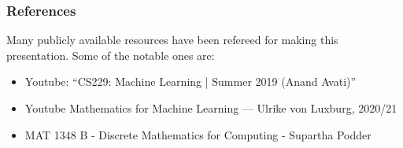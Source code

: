 \begin{frame}\frametitle{References}
Many publicly available resources have been refereed for making this presentation. Some of the notable ones are:
\small
\begin{itemize}
\item Youtube: ``CS229: Machine Learning | Summer 2019 (Anand Avati)''
\item Youtube Mathematics for Machine Learning — Ulrike von Luxburg, 2020/21
\item MAT 1348 B - Discrete Mathematics for Computing - Supartha Podder
\end{itemize}
\end{frame}

